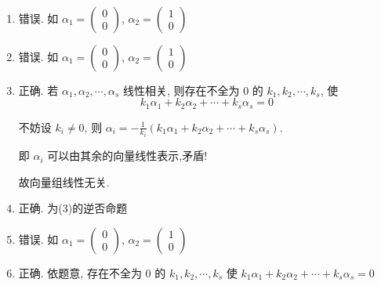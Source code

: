 	 \paragraph{} %
		 \begin{enumerate}
			 \item %
			       错误. 如 \( \alpha_{1} =
			       \begin{pmatrix}
				       0 \\
				       0\end{pmatrix} \), \( \alpha_{2} =
			       \begin{pmatrix}
				       1 \\
				       0\end{pmatrix} \)
			 \item %
			       错误. 如 \( \alpha_{1} =
			       \begin{pmatrix}
				       0 \\
				       0\end{pmatrix} \), \( \alpha_{2} =
			       \begin{pmatrix}
				       1 \\
				       0\end{pmatrix} \)
			 \item %
			       正确. 若 \( \alpha_{1}, \alpha_{2}, \cdots, \alpha_{s} \) 线性相关, 则存在不全为 0 的 \( k_{1}, k_{2}, \cdots, k_{s} \), 使 \[ k_{1}\alpha_{1} + k_{2}\alpha_{2} + \cdots + k_{s}\alpha_{s} = 0 \]

			       不妨设 \( k_{i} \neq 0 \), 则 \( \alpha_{i} = -\frac{1}{k_{i}}(k_{1}\alpha_{1} + k_{2}\alpha_{2} + \cdots + k_{s}\alpha_{s}) \).

			       即 \( \alpha_{i} \) 可以由其余的向量线性表示,矛盾!

			       故向量组线性无关.

			 \item %
			       正确. 为(3)的逆否命题
			 \item %
			       错误. 如 \( \alpha_{1} =
			       \begin{pmatrix}
				       0 \\
				       0\end{pmatrix} \), \( \alpha_{2} =
			       \begin{pmatrix}
				       1 \\
				       0\end{pmatrix} \)
			 \item %
			       正确. 依题意, 存在不全为 0 的 \( k_{1}, k_{2}, \cdots, k_{s} \) 使 \( k_{1}\alpha_{1} + k_{2}\alpha_{2} + \cdots + k_{s}\alpha_{s} = 0 \)


\end{enumerate}
